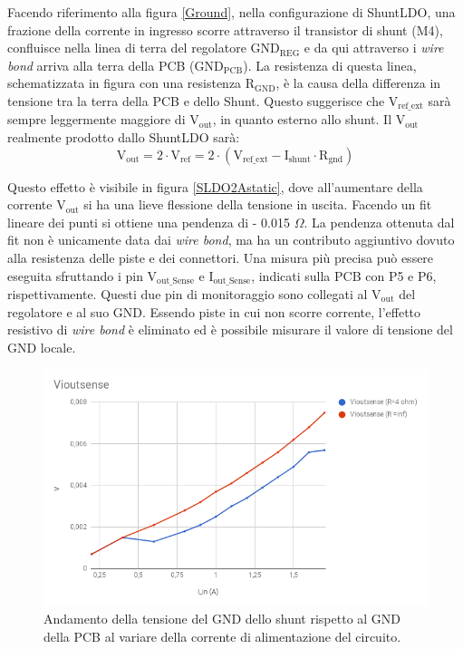 Facendo riferimento alla figura \ref{Ground}, nella configurazione di ShuntLDO, una frazione della corrente in ingresso scorre attraverso il transistor di shunt (M4), confluisce nella linea di terra del regolatore $\mathrm{GND_{REG}}$ e da qui attraverso i \textit{wire bond} arriva alla terra della PCB ($\mathrm{GND_{PCB}}$). 
La resistenza di questa linea, schematizzata in figura con una resistenza $\mathrm{R_{GND}}$, è la causa della differenza in tensione tra la terra della PCB e dello Shunt. 
Questo suggerisce che $\mathrm{V_{ref {\_} ext}}$ sarà sempre leggermente maggiore di $\mathrm{V_{out}}$, in quanto esterno allo shunt.
Il $\mathrm{V_{out}}$ realmente prodotto dallo ShuntLDO sarà:
\begin{equation}
  \mathrm{V_{out} = 2 \cdot V_{ref} = 2 \cdot ( V_{ref {\_} ext} - I_{shunt} \cdot R_{gnd} )}
\end{equation}

Questo effetto è visibile in figura \ref{SLDO2Astatic}, dove all'aumentare della corrente $\mathrm{V_{out}}$ si ha una lieve flessione della tensione in uscita. Facendo un fit lineare dei punti si ottiene una pendenza di - 0.015 $\Omega$. 
La pendenza ottenuta dal fit non è unicamente data dai \textit{wire bond}, ma ha un contributo aggiuntivo dovuto alla resistenza delle piste e dei connettori.
Una misura più precisa può essere eseguita sfruttando i pin $\mathrm{V_{out{\_}Sense}}$ e $\mathrm{I_{out {\_} Sense}}$, indicati sulla PCB con P5 e P6, rispettivamente. 
Questi due pin di monitoraggio sono collegati al $\mathrm{V_{out}}$ del regolatore e al suo GND.
Essendo piste in cui non scorre corrente, l'effetto resistivo di \textit{wire bond} è eliminato ed è possibile misurare il valore di tensione del GND locale.

\begin{figure}
\centering
\includegraphics[scale=.4]{Immagini/Viout}
\caption{Andamento della tensione del GND dello shunt rispetto al GND della PCB al variare della corrente di alimentazione del circuito.}
\label{VioutSense}
\end{figure}

